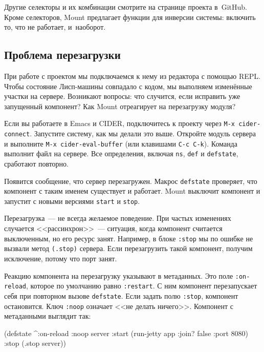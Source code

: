 Другие селекторы и их комбинации смотрите на странице проекта в~GitHub. Кроме
селекторов, Mount предлагает функции для инверсии системы: включить то, что не
работает, и~наоборот.

\subsection{Проблема перезагрузки}

При работе с проектом мы подключаемся к нему из редактора с помощью REPL. Чтобы
состояние Лисп-машины совпадало с кодом, мы выполняем изменённые участки на
сервере. Возникают вопросы: что случится, если исправить уже запущенный
компонент? Как Mount отреагирует на перезагрузку модуля?


Если вы работаете в Emacs и CIDER, подключитесь к проекту через
\verb|M-x cider-connect|. Запустите систему, как мы делали это выше.
Откройте модуль сервера и выполните \verb|M-x cider-eval-buffer|
(или клавишами \verb|C-c C-k|). Команда выполнит файл на сервере.
Все определения, включая \verb|ns|, \verb|def| и \verb|defstate|,
сработают повторно.

Появится сообщение, что сервер перезагружен. Макрос \verb|defstate| проверяет,
что компонент с таким именем существует и работает. Mount выключит компонент и
запустит с новыми версиями \verb|start| и \verb|stop|.

Перезагрузка~--- не всегда желаемое поведение. При частых изменениях случается
<<рассинхрон>>~--- ситуация, когда компонент считается выключенным, но его
ресурс занят. Например, в блоке \verb|:stop| мы по ошибке не вызвали метод
\verb|(.stop)| сервера. Если перезагрузить такой компонент, получим исключение,
потому что порт занят.

Реакцию компонента на перезагрузку указывают в метаданных. Это поле
\verb|:on-reload|, которое по умолчанию равно \verb|:restart|. С ним компонент
перезапускает себя при повторном вызове \verb|defstate|. Если задать полю
\verb|:stop|, компонент остановится. Ключ \verb|:noop| означает <<не делать
ничего>>. Компонент с метаданными выглядит так:

\ifx\DEVICETYPE\MOBILE

\begin{english}
  \begin{clojure}
(defstate
  ^{:on-reload :noop}
  server
  :start (run-jetty app
           {:join? false :port 8080})
  :stop (.stop server))
  \end{clojure}
\end{english}

